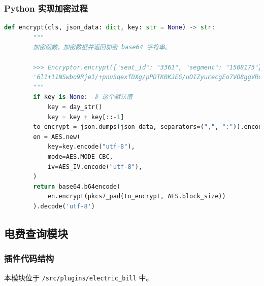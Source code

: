 \documentclass[14pt,a4paper,UTF8,twoside]{article}
\begin{document}
\subsubsection*{Python 实现加密过程}

\vspace{0.3cm}

\begin{lstlisting}[language=Python, caption=Python加密复现代码]
    def encrypt(cls, json_data: dict, key: str = None) -> str:
        """
        加密函数，加密数据并返回加密 base64 字符串。

        >>> Encryptor.encrypt({"seat_id": "3361", "segment": "1508173"}, "2024112882114202")
        '6l1+11NSwbo9Rje1/+pnuSqexfDXg/pPDTK0KJEG/uOIZyucecgEo7VO8ggVRom9'
        """
        if key is None:  # 这个默认值
            key = day_str()
            key = key + key[::-1]
        to_encrypt = json.dumps(json_data, separators=(",", ":")).encode("utf-8")
        en = AES.new(
            key=key.encode("utf-8"),
            mode=AES.MODE_CBC,
            iv=AES_IV.encode("utf-8"),
        )
        return base64.b64encode(
            en.encrypt(pkcs7_pad(to_encrypt, AES.block_size))
        ).decode('utf-8')
\end{lstlisting}

\subsection{电费查询模块}

\subsubsection{插件代码结构}

\begin{mdframed}
本模块位于 \texttt{/src/plugins/electric\_bill} 中。
\end{mdframed}
\end{document}
